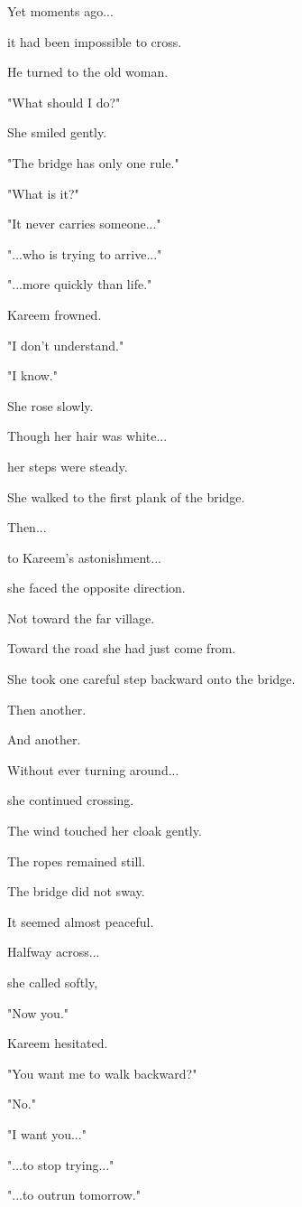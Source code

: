 \documentclass[12pt,openany]{book}
\begin{document}
Yet moments ago...

it had been impossible to cross.

He turned to the old woman.

"What should I do?"

She smiled gently.

"The bridge has only one rule."

"What is it?"

"It never carries someone..."

"...who is trying to arrive..."

"...more quickly than life."

Kareem frowned.

"I don't understand."

"I know."

She rose slowly.

Though her hair was white...

her steps were steady.

She walked to the first plank of the bridge.

Then...

to Kareem's astonishment...

she faced the opposite direction.

Not toward the far village.

Toward the road she had just come from.

She took one careful step backward onto the bridge.

Then another.

And another.

Without ever turning around...

she continued crossing.

The wind touched her cloak gently.

The ropes remained still.

The bridge did not sway.

It seemed almost peaceful.

Halfway across...

she called softly,

"Now you."

Kareem hesitated.

"You want me to walk backward?"

"No."

"I want you..."

"...to stop trying..."

"...to outrun tomorrow."
\end{document}
